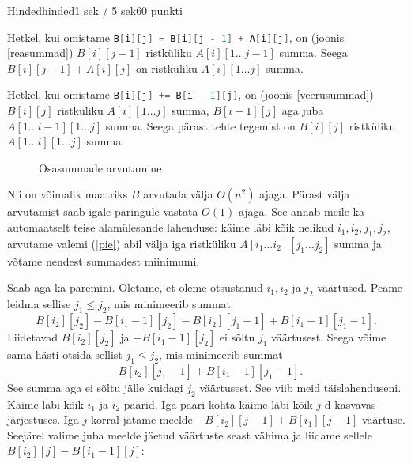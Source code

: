 \begin{yl}{5}{Hinded}{hinded}{1 sek / 5 sek}{60 punkti}
  \begin{xenum}
  \item Hetkel, kui omistame \lstinline[language=C++]|B[i][j] = B[i][j - 1] + A[i][j]|, on (joonis \ref{reasummad})
    $B[i][j - 1]$ ristküliku $A[i][1 \ldots j - 1]$ summa. Seega
    $B[i][j - 1] + A[i][j]$ on ristküliku $A[i][1 \ldots j]$ summa.
  \item Hetkel, kui omistame \lstinline[language=C++]|B[i][j] += B[i - 1][j]|, on (joonis \ref{veerusummad})
    $B[i][j]$ ristküliku $A[i][1 \ldots j]$ summa, $B[i - 1][j]$ aga
    juba $A[1 \ldots i - 1][1 \ldots j]$ summa. Seega pärast tehte tegemist
    on $B[i][j]$ ristküliku $A[1 \ldots i][1 \ldots j]$ summa.
  \end{xenum}

  \begin{figure}[h]
    \centering
    \qquad
    \caption{Osasummade arvutamine}
  \end{figure}

  Nii on võimalik maatriks $B$ arvutada välja $O(n^2)$ ajaga. Pärast välja arvutamist
  saab igale päringule vastata $O(1)$ ajaga.
  See annab meile ka automaatselt teise alamülesande lahenduse: käime läbi kõik
  nelikud $i_1, i_2, j_1, j_2$, arvutame valemi (\ref{pie}) abil välja iga ristküliku
  $A[i_1 \ldots i_2][j_1 \ldots j_2]$ summa ja võtame nendest summadest miinimumi.

  Saab aga ka paremini. Oletame, et oleme otsustanud $i_1, i_2$ ja $j_2$ väärtused.
  Peame leidma sellise $j_1 \le j_2$, mis minimeerib summat
  \[ B[i_2][j_2] - B[i_1 - 1][j_2] - B[i_2][j_1 - 1] + B[i_1 - 1][j_1 - 1]. \]
  Liidetavad $B[i_2][j_2]$ ja $-B[i_1 - 1][j_2]$ ei sõltu $j_1$ väärtusest. Seega
  võime sama hästi otsida sellist $j_1 \le j_2$, mis minimeerib summat
  \[ - B[i_2][j_1 - 1] + B[i_1 - 1][j_1 - 1]. \]
  See summa aga ei sõltu jälle kuidagi $j_2$ väärtusest. See viib meid täislahenduseni.
  Käime läbi kõik $i_1$ ja $i_2$ paarid. Iga paari kohta käime läbi kõik $j$-d kasvavas
  järjestuses. Iga $j$ korral jätame meelde $-B[i_2][j-1] + B[i_1][j-1]$ väärtuse.
  Seejärel valime juba meelde jäetud väärtuste seast vähima ja liidame sellele
  $B[i_2][j] - B[i_1 - 1][j]$:


\end{yl}
